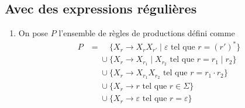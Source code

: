 \subsection{Avec des expressions régulières}

\begin{enumerate}[start=3]
  \item On pose $P$ l'ensemble de règles de productions défini comme
    \begin{align*}
      P &= \phantom\cup\{X_r \to X_r X_{r'}  \mid \varepsilon \text{ tel que } r = (r')^* \}\\
	&\phantom=\cup \{X_r \to X_{r_1} \mid X_{r_2} \text{ tel que } r = r_1  \mid r_2 \} \\
	&\phantom=\cup \{X_r \to X_{r_1} X_{r_2} \text{ tel que } r = r_1 \cdot r_2 \} \\
	&\phantom=\cup \{X_r \to r \text{ tel que } r \in \Sigma \} \\
	&\phantom=\cup \{X_r \to \varepsilon \text{ tel que } r = \varepsilon \} \\
    \end{align*}
\end{enumerate}

